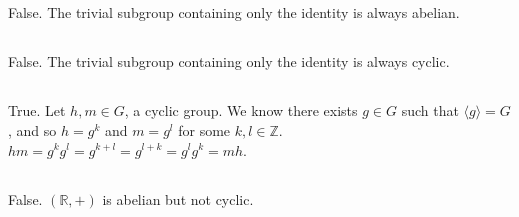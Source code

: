 \documentclass{article}
\begin{document}
\subsection{} %
False. The trivial subgroup containing only the identity is always abelian.
\subsection{} %
False. The trivial subgroup containing only the identity is always cyclic.
\subsection{} %
True. Let $h,m\in G$, a cyclic group. We know there exists $g\in G$ such that
$\langle g\rangle=G$, and so $h=g^k$ and $m=g^l$ for some $k,l\in\mathbb{Z}$.
$hm=g^kg^l=g^{k+l}=g^{l+k}=g^lg^k=mh$.
\subsection{} %
False. $(\mathbb{R},+)$ is abelian but not cyclic.
\end{document}
